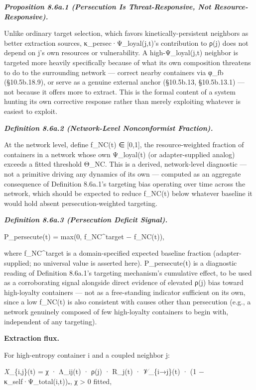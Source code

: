 \documentclass[
]{article}
\begin{document}
\emph{\textbf{Proposition 8.6a.1 (Persecution Is Threat-Responsive, Not
Resource-Responsive).}}

Unlike ordinary target selection, which favors kinetically-persistent
neighbors as better extraction sources, κ\_persec·Ψ\_loyal(j,t)'s
contribution to ρ(j) does not depend on j's own resources or
vulnerability. A high-Ψ\_loyal(j,t) neighbor is targeted more heavily
specifically because of what its own composition threatens to do to the
surrounding network --- correct nearby containers via φ\_fb
(§10.5b.18.9), or serve as a genuine external anchor (§10.5b.13,
§10.5b.13.1) --- not because it offers more to extract. This is the
formal content of a system hunting its own corrective response rather
than merely exploiting whatever is easiest to exploit.

\emph{\textbf{Definition 8.6a.2 (Network-Level Nonconformist
Fraction).}}

At the network level, define f\_NC(t) ∈ {[}0,1{]}, the resource-weighted
fraction of containers in a network whose own Ψ\_loyal(t) (or
adapter-supplied analog) exceeds a fitted threshold Θ\_NC. This is a
derived, network-level diagnostic --- not a primitive driving any
dynamics of its own --- computed as an aggregate consequence of
Definition 8.6a.1's targeting bias operating over time across the
network, which should be expected to reduce f\_NC(t) below whatever
baseline it would hold absent persecution-weighted targeting.

\emph{\textbf{Definition 8.6a.3 (Persecution Deficit Signal).}}

P\_persecute(t) = max(0, f\_NC\^{}target − f\_NC(t)),

where f\_NC\^{}target is a domain-specified expected baseline fraction
(adapter-supplied; no universal value is asserted here). P\_persecute(t)
is a diagnostic reading of Definition 8.6a.1's targeting mechanism's
cumulative effect, to be used as a corroborating signal alongside direct
evidence of elevated ρ(j) bias toward high-loyalty containers --- not as
a free-standing indicator sufficient on its own, since a low f\_NC(t) is
also consistent with causes other than persecution (e.g., a network
genuinely composed of few high-loyalty containers to begin with,
independent of any targeting).

\textbf{Extraction flux.}

For high-entropy container i and a coupled neighbor j:

\emph{X}\_\{i,j\}(t) = χ · Λ\_ij(t) · ρ(j) · R\_j(t) · 𝒱\_\{i→j\}(t) ·
(1 − κ\_self·Ψ\_total(i,t))₊, χ \textgreater{} 0 fitted,
\end{document}
